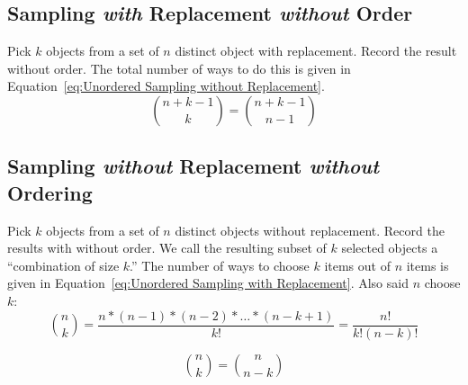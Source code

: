 	\subsection{Sampling \emph{with} Replacement \emph{without} Order} \label{subsec:Unordered Sampling with Replacement}
		\begin{definition} \label{def:Unordered Sampling without Replacement}
			Pick $k$ objects from a set of $n$ distinct object with replacement.
			Record the result without order.
			The total number of ways to do this is given in Equation~\eqref{eq:Unordered Sampling without Replacement}.
			\begin{equation} \label{eq:Unordered Sampling without Replacement}
				\binom{n+k-1}{k} = \binom{n+k-1}{n-1}
			\end{equation}
		\end{definition}
	
	\subsection{Sampling \emph{without} Replacement \emph{without} Ordering} \label{subsec:Unordered Sampling without Replacement}		
		\begin{definition} \label{def:Unordered Sampling with Replacement}
			Pick $k$ objects from a set of $n$ distinct objects without replacement.
			Record the results with without order.
			We call the resulting subset of $k$ selected objects a ``combination of size $k$.''
			The number of ways to choose $k$ items out of $n$ items is given in Equation~\eqref{eq:Unordered Sampling with Replacement}.
			Also said $n$ choose $k$:
			\begin{equation} \label{eq:Unordered Sampling with Replacement}
			\binom{n}{k} = \frac{n * (n-1) * (n-2) * \ldots * (n-k+1)}{k!} = \frac{n!}{k! \left( n-k \right)!}
			\end{equation}
		\end{definition}
		\begin{equation}
			\binom{n}{k} = \binom{n}{n-k}
		\end{equation}